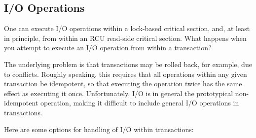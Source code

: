 \subsection{I/O Operations}
\label{sec:future:I/O Operations}

One can execute I/O operations within a lock-based critical section,
and, at least in principle, from within an RCU read-side critical section.
What happens when you attempt to execute an I/O operation from within
a transaction?

The underlying problem is that transactions may be rolled back, for
example, due to conflicts.
Roughly speaking, this requires that all operations within any given
transaction be idempotent, so that executing the operation twice has
the same effect as executing it once.
Unfortunately, I/O is in general the prototypical non-idempotent
operation, making it difficult to include general I/O operations in
transactions.

Here are some options for handling of I/O within transactions:

